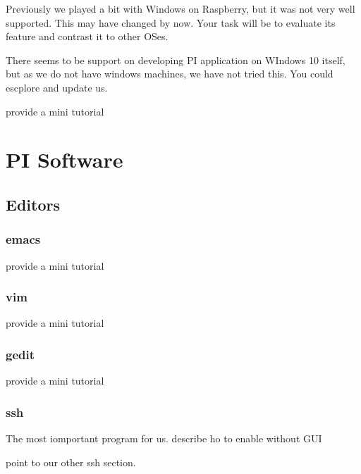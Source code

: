 Previously we played a bit with Windows on Raspberry, but it was not
very well supported. This may have changed by now. Your task will be to
evaluate its feature and contrast it to other OSes.

There seems to be support on developing PI application on WIndows 10
itself, but as we do not have windows machines, we have not tried
this. You could escplore and update us.

\begin{exercise}
provide a mini tutorial 
\end{exercise}

\chapter{PI Software}

\section{Editors}

\subsection{emacs}

\begin{exercise}
provide a mini tutorial 
\end{exercise}

\subsection{vim}

\begin{exercise}
provide a mini tutorial 
\end{exercise}

\subsection{gedit}

\begin{exercise}
provide a mini tutorial 
\end{exercise}


\subsection{ssh}

The most iomportant program for us. describe ho to enable without GUI

point to our other ssh section.

